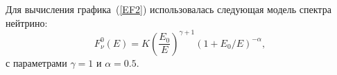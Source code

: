 Для вычисления графика~(\ref{EF2}) использовалась следующая модель спектра нейтрино:
\begin{equation}
    F_{\nu}^{0}(E) = K\left(\frac{E_0}{E}\right)^{\gamma+1} (1+E_0/E)^{-\alpha},%
\end{equation}
с параметрами $\gamma = 1$ и $\alpha = 0.5$. 
